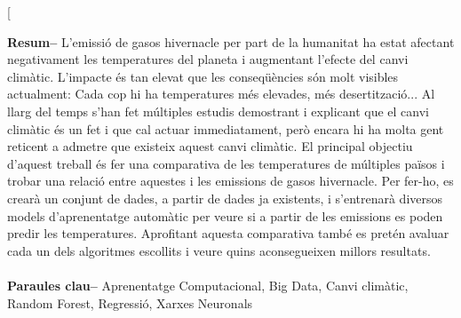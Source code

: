 \documentclass[10pt,a4paper,twocolumn,twoside]{article}
\begin{document}
\twocolumn[\begin{@twocolumnfalse}


\maketitle

\thispagestyle{primerapagina}
\begin{center}
\parbox{0.915\textwidth}
{\sffamily
\textbf{Resum--}
L'emissió de gasos hivernacle per part de la humanitat ha estat afectant negativament les temperatures del planeta i augmentant l'efecte del canvi climàtic. L'impacte és tan elevat que les conseqüències són molt visibles actualment: Cada cop hi ha temperatures més elevades, més desertització... Al llarg del temps s'han fet múltiples estudis demostrant i explicant que el canvi climàtic és un fet i que cal actuar immediatament, però encara hi ha molta gent reticent a admetre que existeix aquest canvi climàtic. El principal objectiu d'aquest treball és fer una comparativa de les temperatures de múltiples països i trobar una relació entre aquestes i les emissions de gasos hivernacle. Per fer-ho, es crearà un conjunt de dades, a partir de dades ja existents, i s'entrenarà diversos models d'aprenentatge automàtic per veure si a partir de les emissions es poden predir les temperatures. Aprofitant aquesta comparativa també es pretén avaluar cada un dels algoritmes escollits i veure quins aconsegueixen millors resultats.
\\
\\
\textbf{Paraules clau-- } Aprenentatge Computacional, Big Data, Canvi climàtic, Random Forest,  Regressió, Xarxes Neuronals \\
\\
\bigskip
\\
}
\end{center}
\end{@twocolumnfalse}
\end{document}
